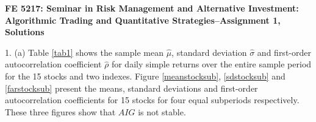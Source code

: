 \documentclass[11pt]{article}
\begin{document}
\textbf{\Large FE 5217: Seminar in Risk Management and Alternative Investment: Algorithmic Trading and Quantitative Strategies--Assignment 1, Solutions}

1. (a) Table \ref{tab1} shows the sample mean $\hat{\mu}$, standard deviation $\hat{\sigma}$ and first-order autocorrelation coefficient $\hat{\rho}$ for daily simple returns over the entire sample period for the 15 stocks and two indexes. Figure \ref{meanstocksub}, \ref{sdstocksub} and \ref{farstocksub} present the means, standard deviations and first-order autocorrelation coefficients for 15 stocks for four equal subperiods respectively. These three figures show that $AIG$ is not stable.
\end{document}
